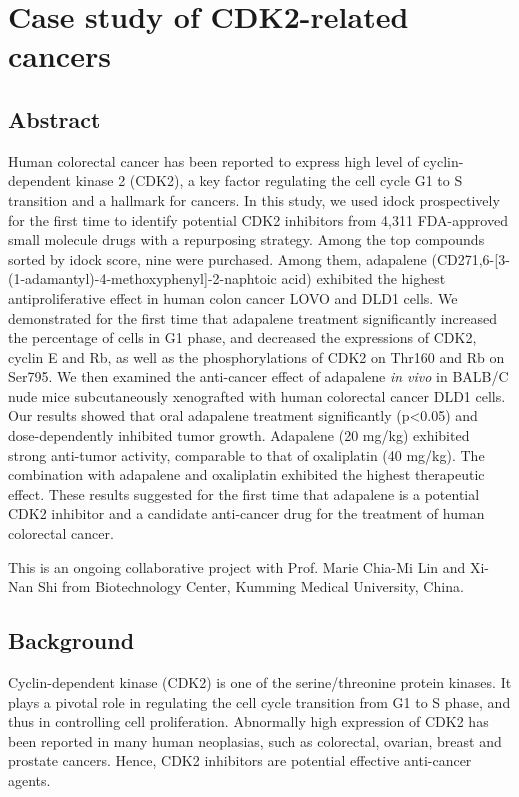 \chapter{Case study of CDK2-related cancers}
\label{cdk2}

\section{Abstract}

Human colorectal cancer has been reported to express high level of cyclin-dependent kinase 2 (CDK2), a key factor regulating the cell cycle G1 to S transition and a hallmark for cancers. In this study, we used idock prospectively for the first time to identify potential CDK2 inhibitors from 4,311 FDA-approved small molecule drugs with a repurposing strategy. Among the top compounds sorted by idock score, nine were purchased. Among them, adapalene (CD271,6-[3-(1-adamantyl)-4-methoxyphenyl]-2-naphtoic acid) exhibited the highest antiproliferative effect in human colon cancer LOVO and DLD1 cells. We demonstrated for the first time that adapalene treatment significantly increased the percentage of cells in G1 phase, and decreased the expressions of CDK2, cyclin E and Rb, as well as the phosphorylations of CDK2 on Thr160 and Rb on Ser795. We then examined the anti-cancer effect of adapalene \textit{in vivo} in BALB/C nude mice subcutaneously xenografted with human colorectal cancer DLD1 cells. Our results showed that oral adapalene treatment significantly (p<0.05) and dose-dependently inhibited tumor growth. Adapalene (20 mg/kg) exhibited strong anti-tumor activity, comparable to that of oxaliplatin (40 mg/kg). The combination with adapalene and oxaliplatin exhibited the highest therapeutic effect. These results suggested for the first time that adapalene is a potential CDK2 inhibitor and a candidate anti-cancer drug for the treatment of human colorectal cancer.

This is an ongoing collaborative project with Prof. Marie Chia-Mi Lin and Xi-Nan Shi from Biotechnology Center, Kumming Medical University, China.

\section{Background}

Cyclin-dependent kinase (CDK2) is one of the serine/threonine protein kinases. It plays a pivotal role in regulating the cell cycle transition from G1 to S phase, and thus in controlling cell proliferation. Abnormally high expression of CDK2 has been reported in many human neoplasias, such as colorectal, ovarian, breast and prostate cancers. Hence, CDK2 inhibitors are potential effective anti-cancer agents.

